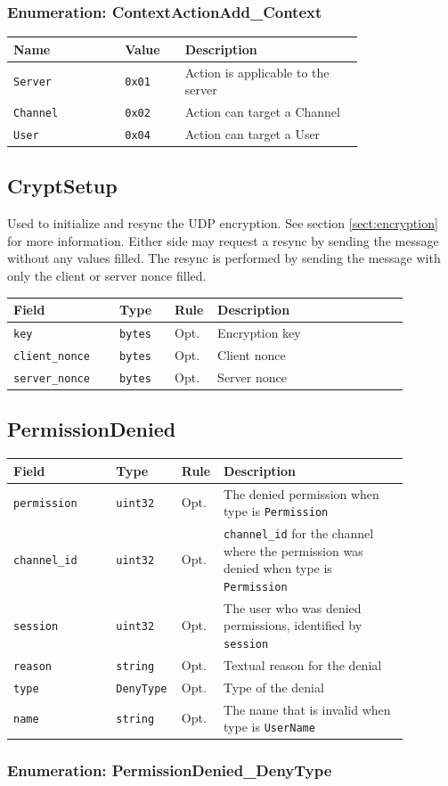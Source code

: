 \documentclass[11pt]{article} %
\newenvironment{mumbleMessageEx}
{%
	\small
	\renewcommand\arraystretch{1.5}
	\begin{tabular}{p{0.25\linewidth}p{0.13\linewidth}p{0.05\linewidth}p{0.45\linewidth}}
	Field & Type & Rule & Description \\
	\hline
}
{%
	\end{tabular}
	\renewcommand\arraystretch{1.0}
}
\newcommand{\mumbleMessageExItem}[4]{ \texttt{#1} & \texttt{#2} & #3 & #4 \\ }
\newenvironment{mumbleEnum}
{%
	\small
	\renewcommand\arraystretch{1.5}
	\begin{tabular}{p{0.25\linewidth}p{0.13\linewidth}p{0.4\linewidth}}
	Name & Value & Description \\
	\hline
}
{%
	\end{tabular}
	\renewcommand\arraystretch{1.0}
}
\newcommand{\mumbleEnumItem}[3]{ \texttt{#1} & \texttt{#2} & #3 \\ }
\begin{document}
\subsubsection{Enumeration: ContextActionAdd\_Context}
\label{msg:contextActionAdd:context}

\begin{mumbleEnum}
\mumbleEnumItem{Server}{0x01}{Action is applicable to the server}
\mumbleEnumItem{Channel}{0x02}{Action can target a Channel}
\mumbleEnumItem{User}{0x04}{Action can target a User}
\end{mumbleEnum}

\subsection{CryptSetup}
\label{msg:cryptSetup}

Used to initialize and resync the UDP encryption. See section \ref{sect:encryption} for more information. Either side may request a resync by sending the message without any values filled. The resync is performed by sending the message with only the client or server nonce filled.

\begin{mumbleMessageEx}
\mumbleMessageExItem{key}{bytes}{Opt.}{Encryption key}
\mumbleMessageExItem{client\_nonce}{bytes}{Opt.}{Client nonce}
\mumbleMessageExItem{server\_nonce}{bytes}{Opt.}{Server nonce}
\end{mumbleMessageEx}

\subsection{PermissionDenied}
\label{msg:permissionDenied}

\begin{mumbleMessageEx}
\mumbleMessageExItem{permission}{uint32}{Opt.}{The denied permission when type is \texttt{Permission}}
\mumbleMessageExItem{channel\_id}{uint32}{Opt.}{\texttt{channel\_id} for the channel where the permission was denied when type is \texttt{Permission}}
\mumbleMessageExItem{session}{uint32}{Opt.}{The user who was denied permissions, identified by \texttt{session}}
\mumbleMessageExItem{reason}{string}{Opt.}{Textual reason for the denial}
\mumbleMessageExItem{type}{DenyType}{Opt.}{Type of the denial}
\mumbleMessageExItem{name}{string}{Opt.}{The name that is invalid when type is \texttt{UserName}}
\end{mumbleMessageEx}

\subsubsection{Enumeration: PermissionDenied\_DenyType}
\label{msg:permissionDenied:denyType}
\end{document}
